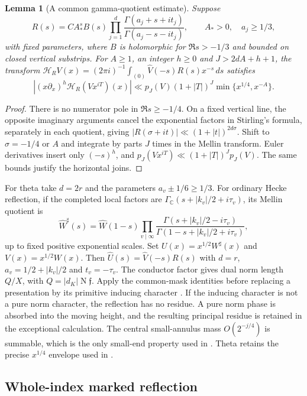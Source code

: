 \documentclass[11pt,a4paper]{article}
\numberwithin{equation}{section}
\newtheorem{lemma}[theorem]{Lemma}
\theoremstyle{definition}
\theoremstyle{remark}
\begin{document}
\begin{lemma}[A common gamma-quotient estimate]\label{lem:gamma-reflection}
Suppose
\[
 R(s)=C A_*^s B(s)\prod_{j=1}^d
       \frac{\Gamma(a_j+s+it_j)}{\Gamma(a_j-s-it_j)},
 \qquad A_*>0,\quad a_j\ge1/3,
\]
with fixed parameters, where $B$ is holomorphic for $\Re s>-1/3$ and
bounded on closed vertical substrips.  For $A\ge1$, an integer $h\ge0$
and $J>2dA+h+1$, the transform
$\mathcal H_RV(x)=(2\pi i)^{-1}\int_{(0)}\widehat V(-s)R(s)x^{-s}\,ds$
satisfies
\begin{equation}\label{eq:unified-reflection-bound}
 |(x\partial_x)^h\mathcal H_R(Vx^{iT})(x)|
 \ll p_J(V)(1+|T|)^J\min\{x^{1/4},x^{-A}\}.
\end{equation}
\end{lemma}
\begin{proof}
There is no numerator pole in $\Re s\ge-1/4$.  On a fixed vertical line,
the opposite imaginary arguments cancel the exponential factors in
Stirling's formula, separately in each quotient, giving
$|R(\sigma+it)|\ll(1+|t|)^{2d\sigma}$.
Shift to $\sigma=-1/4$ or $A$ and integrate by parts $J$ times in the
Mellin transform.  Euler derivatives insert only $(-s)^h$, and
$p_J(Vx^{iT})\ll(1+|T|)^Jp_J(V)$.  The same bounds justify the
horizontal joins.
\end{proof}

For theta take $d=2r$ and the parameters $a_v\pm1/6\ge1/3$.
For ordinary Hecke reflection, if the completed local factors are
$\Gamma_{\mathbb C}(s+|k_v|/2+i\tau_v)$, its Mellin quotient is
\[
 \widehat W^\sharp(s)=\widehat W(1-s)
       \prod_{v\mid\infty}
       \frac{\Gamma(s+|k_v|/2-i\tau_v)}
            {\Gamma(1-s+|k_v|/2+i\tau_v)},
\]
up to fixed positive exponential scales.  Set
$U(x)=x^{1/2}W^\sharp(x)$ and $V(x)=x^{1/2}W(x)$.
Then $\widehat U(s)=\widehat V(-s)R(s)$ with $d=r$,
$a_v=1/2+|k_v|/2$ and $t_v=-\tau_v$.  The conductor factor gives dual
norm length $Q/X$, with $Q=|d_K|\operatorname N\mathfrak f$.
Apply the common-mask identities before replacing a presentation by its
primitive inducing character \cite[(18.4)--(18.8)]{Q}.
If the inducing character is not a pure norm character, the reflection
has no residue.  A pure norm phase is absorbed into the moving height,
and the resulting principal residue is retained in the exceptional
calculation.
The central small-annulus mass $O(2^{-j/4})$ is summable, which is the
only small-end property used in \cite[Section~18.1]{Q}.
Theta retains the precise $x^{1/4}$ envelope used in
\cite[Lemma~5.3]{Q}.

\subsection{Whole-index marked reflection}\label{sec:full-marked-reflection}
\end{document}
